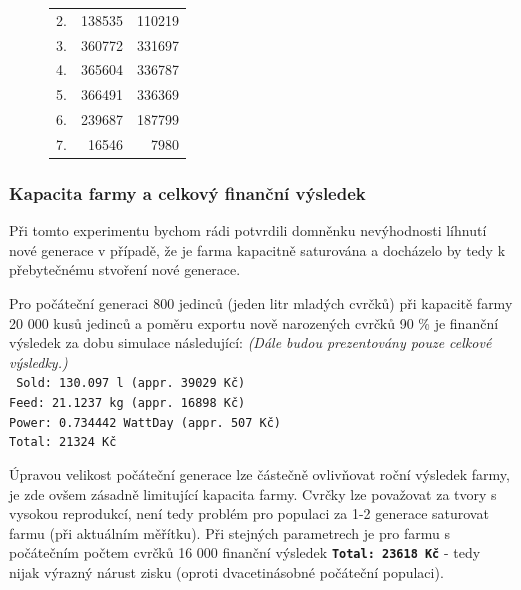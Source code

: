 \documentclass[11pt, a4paper, titlepage]{article}
\begin{document}
\begin{figure}[H]
\begin{minipage}{.5\textwidth}
\begin{center}
\begin{table}[H]
\begin{tabular}{|r|r|r|}
                        2. & 138535 & 110219 \\
                        3. & 360772 & 331697 \\
                        4. & 365604 & 336787 \\
                        5. & 366491 & 336369 \\
                        6. & 239687 & 187799 \\
                        7. & 16546 & 7980 \\
                        \hline
                    \end{tabular}
                \end{table}
            \end{center}
        \end{minipage}
    \end{figure}
    \vspace{-20pt}
    \subsubsection{Kapacita farmy a celkový finanční výsledek}
    Při tomto experimentu bychom rádi potvrdili domněnku nevýhodnosti líhnutí nové generace v případě, že je farma
    kapacitně saturována a docházelo by tedy k přebytečnému stvoření nové generace.

    Pro počáteční generaci 800 jedinců (jeden litr mladých cvrčků) při kapacitě farmy 20 000 kusů jedinců a poměru exportu nově narozených cvrčků 90 \%
    je finanční výsledek za dobu simulace následující: \textit{(Dále budou prezentovány pouze celkové výsledky.)} \\
    \texttt{
        Sold: 130.097 l (appr. 39029 Kč)\\
        Feed: 21.1237 kg (appr. 16898 Kč)\\
        Power: 0.734442 WattDay (appr. 507 Kč)\\
        Total: 21324 Kč\\
    }

    Úpravou velikost počáteční generace lze částečně ovlivňovat roční výsledek farmy, je zde ovšem zásadně limitující
    kapacita farmy. Cvrčky lze považovat za tvory s vysokou reprodukcí, není tedy problém pro populaci za 1-2 generace
    saturovat farmu (při aktuálním měřítku). Při stejných parametrech je pro farmu s počátečním počtem cvrčků 16 000
    finanční výsledek \textbf{\texttt{Total: 23618 Kč}} - tedy nijak výrazný nárust zisku (oproti dvacetinásobné
    počáteční populaci).
\end{document}
